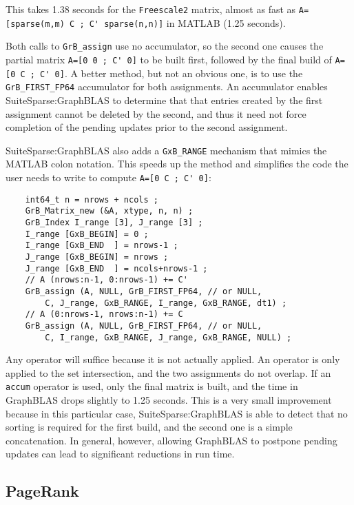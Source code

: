 \documentclass[12pt]{article}
\begin{document}
This takes 1.38 seconds for the \verb'Freescale2' matrix, almost as fast as
\verb"A=[sparse(m,m) C ; C' sparse(n,n)]" in MATLAB (1.25 seconds).

Both calls to \verb'GrB_assign' use no accumulator, so the second one
causes the partial matrix \verb"A=[0 0 ; C' 0]" to be built first, followed by
the final build of \verb"A=[0 C ; C' 0]".  A better method, but not an obvious
one, is to use the \verb'GrB_FIRST_FP64' accumulator for both assignments.  An
accumulator enables SuiteSparse:GraphBLAS to determine that that entries
created by the first assignment cannot be deleted by the second, and thus it
need not force completion of the pending updates prior to the second
assignment.

SuiteSparse:GraphBLAS also adds a \verb'GxB_RANGE' mechanism that mimics
the MATLAB colon notation.  This speeds up the method and simplifies the
code the user needs to write to compute \verb"A=[0 C ; C' 0]":

    \vspace{-0.05in}
    {\footnotesize
    \begin{verbatim}
    int64_t n = nrows + ncols ;
    GrB_Matrix_new (&A, xtype, n, n) ;
    GrB_Index I_range [3], J_range [3] ;
    I_range [GxB_BEGIN] = 0 ;
    I_range [GxB_END  ] = nrows-1 ;
    J_range [GxB_BEGIN] = nrows ;
    J_range [GxB_END  ] = ncols+nrows-1 ;
    // A (nrows:n-1, 0:nrows-1) += C'
    GrB_assign (A, NULL, GrB_FIRST_FP64, // or NULL,
        C, J_range, GxB_RANGE, I_range, GxB_RANGE, dt1) ;
    // A (0:nrows-1, nrows:n-1) += C
    GrB_assign (A, NULL, GrB_FIRST_FP64, // or NULL,
        C, I_range, GxB_RANGE, J_range, GxB_RANGE, NULL) ; \end{verbatim}}

Any operator will suffice because it is not actually applied.  An operator is
only applied to the set intersection, and the two assignments do not overlap.
If an \verb'accum' operator is used, only the final matrix is built, and the
time in GraphBLAS drops slightly to 1.25 seconds.  This is a very small
improvement because in this particular case, SuiteSparse:GraphBLAS is able to
detect that no sorting is required for the first build, and the second one is a
simple concatenation.  In general, however, allowing GraphBLAS to postpone
pending updates can lead to significant reductions in run time.

\subsection{PageRank}
\label{pagerank}
\end{document}
